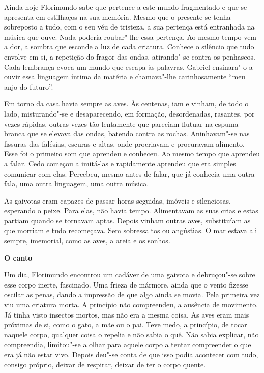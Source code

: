 Ainda hoje Florimundo sabe que pertence a este mundo fragmentado e que
se apresenta em estilhaços na sua memória. Mesmo que o presente se tenha
sobreposto a tudo, com o seu véu de tristeza, a sua pertença está
entranhada na música que ouve. Nada poderia roubar"-lhe essa pertença. Ao
mesmo tempo vem a dor, a sombra que esconde a luz de cada criatura.
Conhece o silêncio que tudo envolve em si, a repetição do fragor das
ondas, atirando"-se contra os penhascos. Cada lembrança evoca um mundo
que escapa às palavras. Gabriel ensinara"-o a ouvir essa linguagem íntima
da matéria e chamava"-lhe carinhosamente ``meu anjo do futuro''.

Em torno da casa havia sempre as aves. Às centenas, iam e vinham, de
todo o lado, misturando"-se e desaparecendo, em formação, desordenadas,
rasantes, por vezes rápidas, outras vezes tão lentamente que pareciam
flutuar na espuma branca que se elevava das ondas, batendo contra as
rochas. Aninhavam"-se nas fissuras das falésias, escuras e altas, onde
procriavam e procuravam alimento. Esse foi o primeiro som que aprendeu e
conheceu. Ao mesmo tempo que aprendeu a falar. Cedo começou a imitá-las
e rapidamente aprendeu que era simples comunicar com elas. Percebeu,
mesmo antes de falar, que já conhecia uma outra fala, uma outra
linguagem, uma outra música.

As gaivotas eram capazes de passar horas seguidas, imóveis e
silenciosas, esperando o peixe. Para elas, não havia tempo. Alimentavam
as suas crias e estas partiam quando se tornavam aptas. Depois vinham
outras aves, substituíam as que morriam e tudo recomeçava. Sem
sobressaltos ou angústias. O mar estava ali sempre, imemorial, como as
aves, a areia e os sonhos.

\vspace*{1.8cm}
\noindent{}\textbf{O canto}

\bigskip

Um dia, Florimundo encontrou um cadáver de uma gaivota e debruçou"-se
sobre esse corpo inerte, fascinado. Uma frieza de mármore, ainda que o
vento fizesse oscilar as penas, dando a impressão de que algo ainda se
movia. Pela primeira vez viu uma criatura morta. A princípio não
compreendeu, a ausência de movimento. Já tinha visto insectos mortos,
mas não era a mesma coisa. As aves eram mais próximas de si, como o
gato, a mãe ou o pai. Teve medo, a princípio, de tocar naquele corpo,
qualquer coisa o repelia e não sabia o quê. Não sabia explicar, não
compreendia, limitou"-se a olhar para aquele corpo a tentar compreender o
que era já não estar vivo. Depois deu"-se conta de que isso podia
acontecer com tudo, consigo próprio, deixar de respirar, deixar de ter o
corpo quente.

